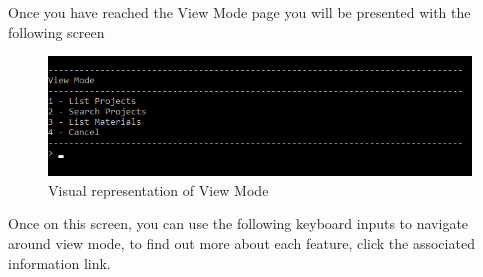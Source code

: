 \documentclass[
  english,
  a4paper,
,tablecaptionabove
]{scrartcl}
\begin{document}
Once you have reached the View Mode page you will be presented with the
following screen

\begin{figure}
\centering
\includegraphics{images/user-guide/view-mode/using-view-mode.png}
\caption{Visual representation of View Mode}
\end{figure}

Once on this screen, you can use the following keyboard inputs to
navigate around view mode, to find out more about each feature, click
the associated information link.
\end{document}
